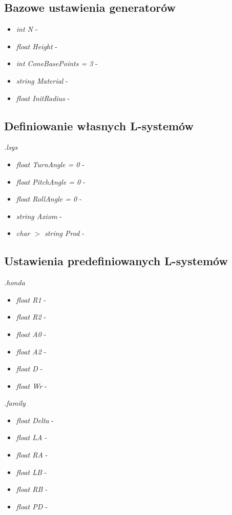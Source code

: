 \documentclass[inz,longabstract]{iithesis}
\begin{document}
        \subsection{Bazowe ustawienia generatorów}
        \begin{itemize}
            \item \textit{int N} -
            \item \textit{float Height} -
            \item \textit{int ConeBasePoints = 3} -
            \item \textit{string Material} -
            \item \textit{float InitRadius} -
        \end{itemize}
        
        \subsection{Definiowanie własnych L-systemów}
        \textit{.lsys}
        \begin{itemize}
            \item \textit{float TurnAngle = 0} -
            \item \textit{float PitchAngle = 0} -
            \item \textit{float RollAngle = 0} -
            \item \textit{string Axiom} -
            \item \textit{char $>$ string Prod} -
        \end{itemize}
        
        \subsection{Ustawienia predefiniowanych L-systemów}
        \textit{.honda}
        \begin{itemize}
            \item \textit{float R1} -
            \item \textit{float R2} -
            \item \textit{float A0} -
            \item \textit{float A2} -
            \item \textit{float D} -
            \item \textit{float Wr} -
        \end{itemize}    
        
        \textit{.family}
        \begin{itemize}
            \item \textit{float Delta} -
            \item \textit{float LA} -
            \item \textit{float RA} -
            \item \textit{float LB} -
            \item \textit{float RB} -
            \item \textit{float PD} -
        \end{itemize}    
        
\end{document}
